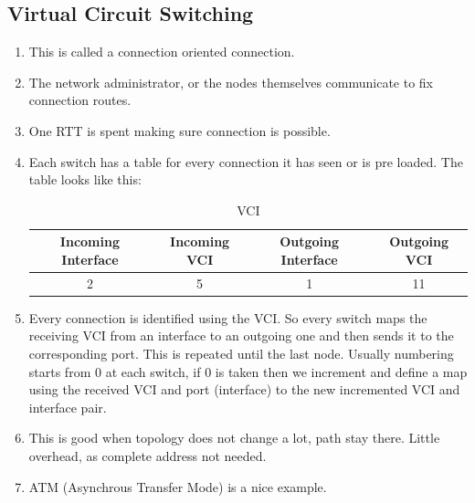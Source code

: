 \documentclass[12pt]{book}
\begin{document}
\subsection{Virtual Circuit Switching}
\begin{enumerate}
    \item This is called a connection oriented connection.
    \item  The network administrator, or the nodes themselves communicate to fix connection routes.
    \item One RTT is spent making sure connection is possible.
    \item Each switch has a table for every connection it has seen or is pre loaded. The table looks like this:
    \begin{table}[H]
        \centering
        \begin{tabular}{ | c | c | c | c |}
        \hline
        Incoming Interface & Incoming VCI & Outgoing Interface & Outgoing VCI \\
        \hline
        2 & 5 & 1 & 11 \\
        \hline
        \end{tabular}
        \caption{VCI}
        \label{tab:VCI Table}
    \end{table}
    \item Every connection is identified using the VCI. So every switch maps the receiving VCI from an interface to an outgoing one and then sends it to the corresponding port. This is repeated until the last node. Usually numbering starts from 0 at each switch, if 0 is taken then we increment and define a map using the received VCI and port (interface) to the new incremented VCI and interface pair.
    \item This is good when topology does not change a lot, path stay there. Little overhead, as complete address not needed.
    \item ATM (Asynchrous Transfer Mode) is a nice example.
\end{enumerate}
\end{document}
